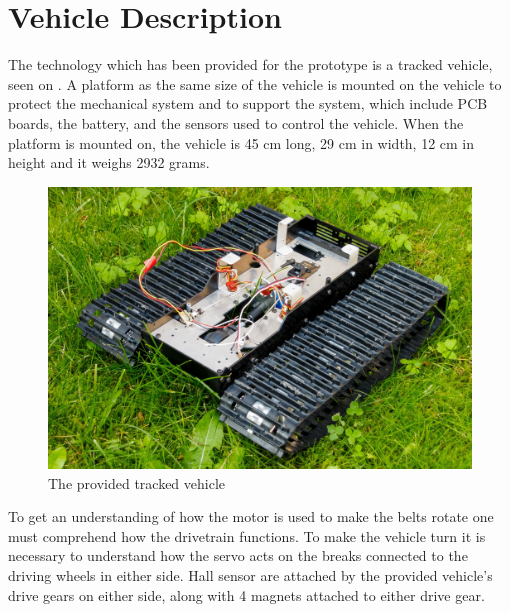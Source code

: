 \section{Vehicle Description}
\label{sec:Vehicledescription}
The technology which has been provided for the prototype is a tracked vehicle, seen on . A platform as the same size of the vehicle is mounted on the vehicle to protect the mechanical system and to support the system, which include PCB boards, the battery, and the sensors used to control the vehicle. When the platform is mounted on, the vehicle is 45 cm long, 29 cm in width, 12 cm in height and it weighs 2932 grams.\\
%
\begin{figure}[H]
	\centering
	\includegraphics[scale=0.6]{figures/BeltVehicle.jpg}
	\caption{The provided tracked vehicle}
	\label{TrackedVehicle}
\end{figure}
%
To get an understanding of how the motor is used to make the belts rotate one must comprehend how the drivetrain functions. To make the vehicle turn it is necessary to understand how the servo acts on the breaks connected to the driving wheels in either side. Hall sensor are attached by the provided vehicle's drive gears on either side, along with 4 magnets attached to either drive gear.